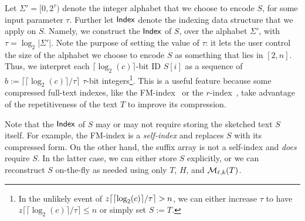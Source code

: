 
 Let $\Sigma'=[0,2^{\tau})$ denote the integer alphabet that we choose to encode $S$, for some input parameter $\tau$.
Further let $\textup{\textsf{Index}}$ denote the indexing data structure that we apply on $S$.
Namely, we construct the $\textup{\textsf{Index}}$ of $S$, over the alphabet $\Sigma'$, with $\tau=\log_2|\Sigma'|$. 
Note the purpose of setting the value of $\tau$: it lets the user control the size of the alphabet we choose to encode $S$ as something that lies in $[2,n]$.
Thus, we interpret each $\lceil\log_2(c)\rceil$-bit ID $S[i]$ as a sequence of $b:= \lceil \lceil\log_2(c)\rceil / \tau \rceil$ $\tau$-bit integers\footnote{In the unlikely event of $z\lceil\lceil\log_2(c)\rceil / \tau\rceil > n$, we can either increase $\tau$ to have $z\lceil\lceil\log_2(c)\rceil / \tau\rceil \leq n$ or simply set $S:=T$.}.
This is a useful feature because some compressed full-text indexes, like the FM-index~\cite{10.1145/1082036.1082039} or the $r$-index~\cite{10.1145/3375890}, take advantage of the repetitiveness of the text $T$ to improve its compression.

Note that the $\textup{\textsf{Index}}$ of $S$ may or may not require storing the sketched text $S$ itself. For example, the FM-index is a \emph{self-index} and replaces $S$ with its compressed form. On the other hand, the suffix array is not a self-index and \emph{does} require $S$. 
In the latter case, 
we can either store
$S$ explicitly, or we can reconstruct $S$ on-the-fly as needed using only $T$, $H$, and $\mathcal{M}_{\ell,k}(T)$.

